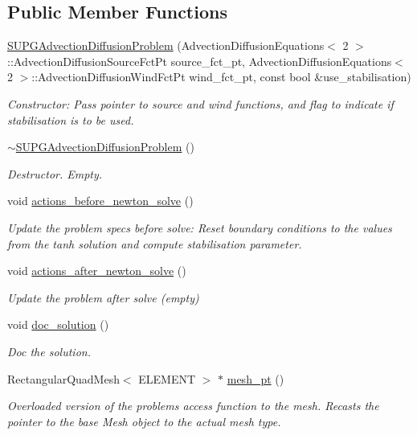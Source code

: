 \subsection*{Public Member Functions}
\begin{DoxyCompactItemize}
\item 
\hyperlink{classSUPGAdvectionDiffusionProblem_a95aa4192c1b42327b12cdbb75295d192}{S\+U\+P\+G\+Advection\+Diffusion\+Problem} (Advection\+Diffusion\+Equations$<$ 2 $>$\+::Advection\+Diffusion\+Source\+Fct\+Pt source\+\_\+fct\+\_\+pt, Advection\+Diffusion\+Equations$<$ 2 $>$\+::Advection\+Diffusion\+Wind\+Fct\+Pt wind\+\_\+fct\+\_\+pt, const bool \&use\+\_\+stabilisation)
\begin{DoxyCompactList}\small\item\em Constructor\+: Pass pointer to source and wind functions, and flag to indicate if stabilisation is to be used. \end{DoxyCompactList}\item 
\hyperlink{classSUPGAdvectionDiffusionProblem_a2112492d8a8a2ad9c0d8ef79e892ebd1}{$\sim$\+S\+U\+P\+G\+Advection\+Diffusion\+Problem} ()
\begin{DoxyCompactList}\small\item\em Destructor. Empty. \end{DoxyCompactList}\item 
void \hyperlink{classSUPGAdvectionDiffusionProblem_affa45863033de517e1fba088aaae7eb5}{actions\+\_\+before\+\_\+newton\+\_\+solve} ()
\begin{DoxyCompactList}\small\item\em Update the problem specs before solve\+: Reset boundary conditions to the values from the tanh solution and compute stabilisation parameter. \end{DoxyCompactList}\item 
void \hyperlink{classSUPGAdvectionDiffusionProblem_a7ca10f3d82af3c3fec4c1a3260062ff2}{actions\+\_\+after\+\_\+newton\+\_\+solve} ()
\begin{DoxyCompactList}\small\item\em Update the problem after solve (empty) \end{DoxyCompactList}\item 
void \hyperlink{classSUPGAdvectionDiffusionProblem_a3133ba26f0917f5d210d69ea0ddcb1fe}{doc\+\_\+solution} ()
\begin{DoxyCompactList}\small\item\em Doc the solution. \end{DoxyCompactList}\item 
Rectangular\+Quad\+Mesh$<$ E\+L\+E\+M\+E\+NT $>$ $\ast$ \hyperlink{classSUPGAdvectionDiffusionProblem_ac54d5c05b91ca542e66760b2f1dd67c9}{mesh\+\_\+pt} ()
\begin{DoxyCompactList}\small\item\em Overloaded version of the problem\textquotesingle{}s access function to the mesh. Recasts the pointer to the base Mesh object to the actual mesh type. \end{DoxyCompactList}\end{DoxyCompactItemize}
